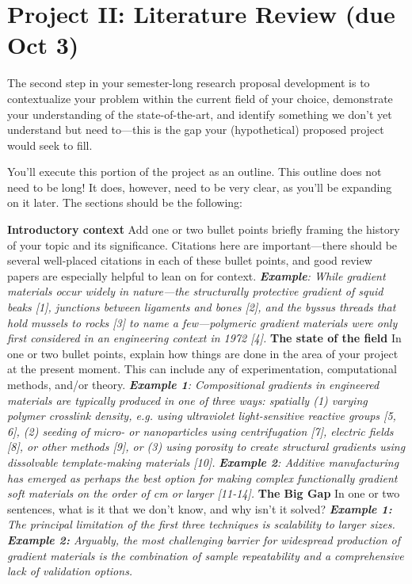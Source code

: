 \section*{Project II: Literature Review (due Oct 3)}

The second step in your semester-long research proposal development is to contextualize your problem within the current field of your choice, demonstrate your understanding of the state-of-the-art, and identify something we don't yet understand but need to---this is the gap your (hypothetical) proposed project would seek to fill.

You'll execute this portion of the project as an outline. 
This outline does not need to be long! 
It does, however, need to be very clear, as you'll be expanding on it later. 
The sections should be the following:

\renewcommand{\outlinei}{enumerate}
\renewcommand{\outlineii}{itemize}
\begin{outline}
    \1 \textbf{Introductory context}
        \2 Add one or two bullet points briefly framing the history of your topic and its significance. 
        \2 Citations here are important---there should be several well-placed citations in each of these bullet points, and good review papers are especially helpful to lean on for context. 
        \2 \textit{\textbf{Example}: While gradient materials occur widely in nature---the structurally protective gradient of squid beaks [1], junctions between ligaments and bones [2], and the byssus threads that hold mussels to rocks [3] to name a few---polymeric gradient materials were only first considered in an engineering context in 1972 [4].}
    \1 \textbf{The state of the field}
        \2 In one or two bullet points, explain how things are done in the area of your project at the present moment. 
        \2 This can include any of experimentation, computational methods, and/or theory.
        \2 \textit{\textbf{Example 1}: Compositional gradients in engineered materials are typically produced in one of three ways: spatially (1) varying polymer crosslink density, e.g. using ultraviolet light-sensitive reactive groups [5, 6], (2) seeding of micro- or nanoparticles using centrifugation [7], electric fields [8], or other methods [9], or (3) using porosity to create structural gradients using dissolvable template-making materials [10].}
        \2 \textit{\textbf{Example 2}: Additive manufacturing has emerged as perhaps the best option for making complex functionally gradient soft materials on the order of cm or larger [11-14].}
    \1 \textbf{The Big Gap}
        \2 In one or two sentences, what is it that we don't know, and why isn't it solved? 
        \2 \textit{\textbf{Example 1:} The principal limitation of the first three techniques is scalability to larger sizes.}
        \2 \textit{\textbf{Example 2:} Arguably, the most challenging barrier for widespread production of gradient materials is the combination of sample repeatability and a comprehensive lack of validation options.} 
\end{outline}

